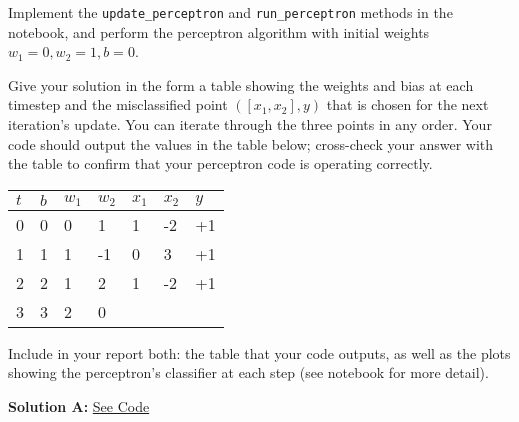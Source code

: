 \documentclass{article}
\begin{document}
\begin{problem}[8]
 Implement the \texttt{update_perceptron} and \texttt{run_perceptron} methods in the notebook, and perform the perceptron algorithm with initial weights $w_1 = 0, w_2 = 1, b = 0$.

  Give your solution in the form a table showing the weights and bias at each timestep and the misclassified point $([x_1,x_2],y)$ that is chosen for the next iteration's update. You can iterate through the three points in any order. Your code should output the values in the table below; cross-check your answer with the table to confirm that your perceptron code is operating correctly.

  \begin{table}[H]
    \centering

    \begin{tabular}{l|lll|ll|l}
    \hline

    \hline
    $t$ & $b$ & $w_1$ & $w_2$ & $x_1$ & $x_2$ & $y$ \\
    \hline
      0  &  0 & 0 & 1  & 1 & -2 & +1\\
      1  &  1 & 1 & -1 & 0 & 3 & +1\\
      2  &  2 & 1 & 2 & 1 & -2 & +1\\
      3  &  3 & 2 & 0 \\
    \hline
    \end{tabular}
  \end{table}
  
  Include in your report both: the table that your code outputs, as well as the plots showing the perceptron's classifier at each step (see notebook for more detail).
  
  
\end{problem}
\textbf{Solution A:} \href{https://drive.google.com/file/d/1jDYPoAj3_Y7aWyw8uBE9DpxD98HK2UUz/view?usp=sharing}{See Code}\\
\begin{figure}[ht]
    \centering
    \hspace{2cm}
    \label{fig:foobar2}
\end{figure}
\end{document}
